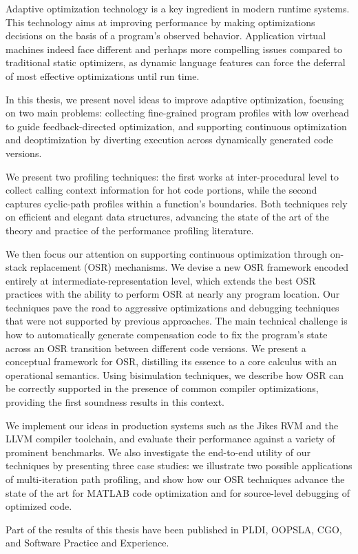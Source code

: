 Adaptive optimization technology is a key ingredient in modern runtime systems. This technology aims at improving performance by making optimizations decisions on the basis of a program's observed behavior. Application virtual machines indeed face different and perhaps more compelling issues compared to traditional static optimizers, as dynamic language features can force the deferral of most effective optimizations until run time.

In this thesis, we present novel ideas to improve adaptive optimization, focusing on two main problems: collecting fine-grained program profiles with low overhead to guide feedback-directed optimization, and supporting continuous optimization and deoptimization by diverting execution across dynamically generated code versions.

We present two profiling techniques: the first works at inter-procedural level to collect calling context information for hot code portions, while the second captures cyclic-path profiles within a function's boundaries. Both techniques rely on efficient and elegant data structures, advancing the state of the art of the theory and practice of the performance profiling literature.

We then focus our attention on supporting continuous optimization through on-stack replacement (OSR) mechanisms. We devise a new OSR framework encoded entirely at intermediate-representation level, which extends the best OSR practices with the ability to perform OSR at nearly any program location. Our techniques pave the road to aggressive optimizations and debugging techniques that were not supported by previous approaches. The main technical challenge is how to automatically generate compensation code to fix the program's state across an OSR transition between different code versions. We present a conceptual framework for OSR, distilling its essence to a core calculus with an operational semantics. Using bisimulation techniques, we describe how OSR can be correctly supported in the presence of common compiler optimizations, providing the first soundness results in this context.

We implement our ideas in production systems such as the Jikes RVM and the LLVM compiler toolchain, and evaluate their performance against a variety of prominent benchmarks. We also investigate the end-to-end utility of our techniques by presenting three case studies: we illustrate two possible applications of multi-iteration path profiling, and show how our OSR techniques advance the state of the art for MATLAB code optimization and for source-level debugging of optimized code.

Part of the results of this thesis have been published in PLDI, OOPSLA, CGO, and Software Practice and Experience.